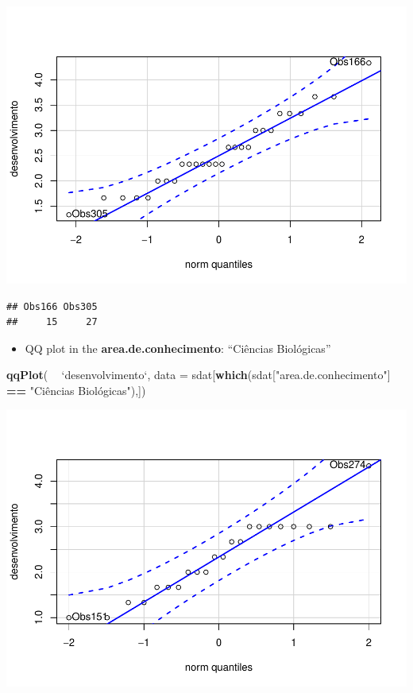 \documentclass[]{article}
\newenvironment{Shaded}{\begin{snugshade}}{\end{snugshade}}
\newcommand{\DataTypeTok}[1]{\textcolor[rgb]{0.13,0.29,0.53}{#1}}
\newcommand{\KeywordTok}[1]{\textcolor[rgb]{0.13,0.29,0.53}{\textbf{#1}}}
\newcommand{\NormalTok}[1]{#1}
\newcommand{\OperatorTok}[1]{\textcolor[rgb]{0.81,0.36,0.00}{\textbf{#1}}}
\newcommand{\StringTok}[1]{\textcolor[rgb]{0.31,0.60,0.02}{#1}}
\providecommand{\tightlist}{%
  \setlength{\itemsep}{0pt}\setlength{\parskip}{0pt}}
\begin{document}
\includegraphics{factorialAnova_files/figure-latex/unnamed-chunk-22-1.pdf}

\begin{verbatim}
## Obs166 Obs305 
##     15     27
\end{verbatim}

\begin{itemize}
\tightlist
\item
  QQ plot in the \textbf{area.de.conhecimento}: ``Ciências Biológicas''
\end{itemize}

\begin{Shaded}
\begin{Highlighting}[]
\KeywordTok{qqPlot}\NormalTok{( }\OperatorTok{~}\StringTok{ `}\DataTypeTok{desenvolvimento}\StringTok{`}\NormalTok{, }\DataTypeTok{data =}\NormalTok{ sdat[}\KeywordTok{which}\NormalTok{(sdat[}\StringTok{"area.de.conhecimento"}\NormalTok{] }\OperatorTok{==}\StringTok{ "Ciências Biológicas"),])}
\end{Highlighting}
\end{Shaded}

\includegraphics{factorialAnova_files/figure-latex/unnamed-chunk-23-1.pdf}
\end{document}
